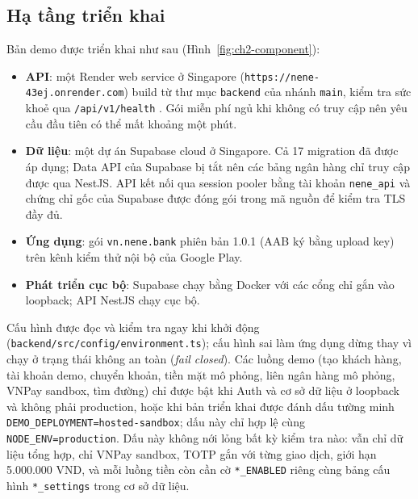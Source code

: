 \subsection{Hạ tầng triển khai}
\label{sec:ch2-deployment}

Bản demo được triển khai như sau (Hình~\ref{fig:ch2-component}):
\begin{itemize}
  \item \textbf{API}: một Render web service ở Singapore (\texttt{https:/\allowbreak{}/\allowbreak{}nene-\allowbreak{}43ej.\allowbreak{}onrender.\allowbreak{}com}) build từ thư mục \texttt{backend} của nhánh \texttt{main}, kiểm tra sức khoẻ qua \texttt{/\allowbreak{}api/\allowbreak{}v1/\allowbreak{}health} \parencite{ch2-render}. Gói miễn phí ngủ khi không có truy cập nên yêu cầu đầu tiên có thể mất khoảng một phút.
  \item \textbf{Dữ liệu}: một dự án Supabase cloud ở Singapore. Cả 17 migration đã được áp dụng; Data API của Supabase bị tắt nên các bảng ngân hàng chỉ truy cập được qua NestJS. API kết nối qua session pooler bằng tài khoản \texttt{nene\_\allowbreak{}api} và chứng chỉ gốc của Supabase được đóng gói trong mã nguồn để kiểm tra TLS đầy đủ.
  \item \textbf{Ứng dụng}: gói \texttt{vn.\allowbreak{}nene.\allowbreak{}bank} phiên bản 1.0.1 (AAB ký bằng upload key) trên kênh kiểm thử nội bộ của Google Play.
  \item \textbf{Phát triển cục bộ}: Supabase chạy bằng Docker với các cổng chỉ gắn vào loopback; API NestJS chạy cục bộ.
\end{itemize}

Cấu hình được đọc và kiểm tra ngay khi khởi động (\texttt{backend/\allowbreak{}src/\allowbreak{}config/\allowbreak{}environment.\allowbreak{}ts}); cấu hình sai làm ứng dụng dừng thay vì chạy ở trạng thái không an toàn (\emph{fail closed}). Các luồng demo (tạo khách hàng, tài khoản demo, chuyển khoản, tiền mặt mô phỏng, liên ngân hàng mô phỏng, VNPay sandbox, tìm đường) chỉ được bật khi Auth và cơ sở dữ liệu ở loopback và không phải production, hoặc khi bản triển khai được đánh dấu tường minh \texttt{DEMO\_\allowbreak{}DEPLOYMENT=hosted-\allowbreak{}sandbox}; dấu này chỉ hợp lệ cùng \texttt{NODE\_\allowbreak{}ENV=production}. Dấu này không nới lỏng bất kỳ kiểm tra nào: vẫn chỉ dữ liệu tổng hợp, chỉ VNPay sandbox, TOTP gắn với từng giao dịch, giới hạn 5.000.000 VND, và mỗi luồng tiền còn cần cờ \texttt{*\_\allowbreak{}ENABLED} riêng cùng bảng cấu hình \texttt{*\_\allowbreak{}settings} trong cơ sở dữ liệu.

